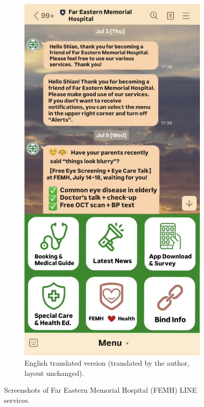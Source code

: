\begin{figure}[H]
\begin{subfigure}[t]{0.3\textwidth}
        \label{fig:line-chinese}
    \end{subfigure}
    \hspace{2cm}
    \begin{subfigure}[t]{0.3\textwidth}
        \centering
        \includegraphics[width=\textwidth]{../../images/line_english.jpg}
        \caption{English translated version (translated by the author, layout unchanged).}
        \label{fig:line-english}
    \end{subfigure}

    \caption{Screenshots of Far Eastern Memorial Hospital (FEMH) LINE services.}
    \label{fig:line-service}
\end{figure}
\noindent

